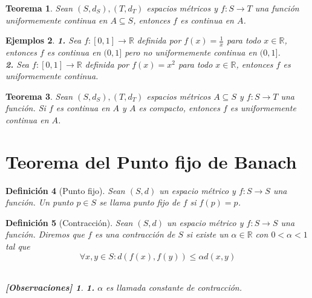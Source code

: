 \documentclass[oneside]{book} %
\theoremstyle{Teorema}
\newtheorem{Definicion}{Definición}[chapter]
\newtheorem{Teorema}[Definicion]{Teorema}
\theoremstyle{Ejemplos}
\newtheorem{Ejemplos}[Definicion]{Ejemplos}
\theoremstyle{[Obs]}
\newtheorem*{Obs}{[Observaciones]}
\renewcommand{\{}{\left\lbrace} %
\renewcommand{\}}{\right\rbrace} %
\renewcommand{\sc}{\subseteq} %
\newcommand{\R}{\mathbb{R}} %
\begin{document}
			\begin{Teorema}

				Sean $(S, d_S), (T, d_T)$ espacios métricos y $f : S \to T$ una función uniformemente continua en $A \sc S$, entonces $f$ es continua en $A$. \\

			\end{Teorema}

			\begin{Ejemplos}

				\hfill

				\textbf{1.} Sea $f : [0, 1] \to \R$ definida por $f(x) = \frac{1}{x}$ para todo $x \in \R$, entonces $f$ es continua en $(0, 1]$ pero no uniformemente continua en $(0, 1]$. \\

				\textbf{2.} Sea $f : [0, 1] \to \R$ definida por $f(x) = x^2$ para todo $x \in \R$, entonces $f$ es uniformemente continua. \\

			\end{Ejemplos}

			\begin{Teorema}

				Sean $(S, d_S), (T, d_T)$ espacios métricos $A \sc S$ y $f : S \to T$ una función. Si $f$ es continua en $A$ y $A$ es compacto, entonces $f$ es uniformemente continua en $A$. \\

			\end{Teorema}

		\section{Teorema del Punto fijo de Banach}

			\begin{Definicion}[Punto fijo]

				Sean $(S, d)$ un espacio métrico y $f : S \to S$ una función. Un punto $p \in S$ se llama punto fijo de $f$ si $f(p) = p$. \\

			\end{Definicion}

			\begin{Definicion}[Contracción]

				Sean $(S, d)$ un espacio métrico y $f : S \to S$ una función. Diremos que $f$ es una contracción de $S$ si existe un $\alpha \in \R$ con $0 < \alpha < 1$ tal que \\

				\[ \forall x, y \in S : d(f(x), f(y)) \leq \alpha d(x, y) \] \\

				\begin{Obs}
				
					\hfill
				
					\textbf{1.} $\alpha$ es llamada constante de contracción. \\
				
				\end{Obs}

			\end{Definicion}
\end{document}

